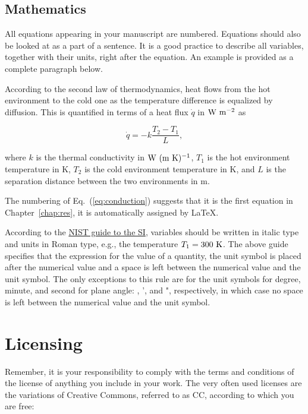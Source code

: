 \subsection{\label{sec:res_maths}Mathematics}

All equations appearing in your manuscript are numbered. Equations should also be looked at as a part of a sentence. It is a good practice to describe all variables, together with their units, right after the equation. An example is provided as a complete paragraph below.

According to the second law of thermodynamics, heat flows from the hot environment to the cold one as the temperature difference is equalized by diffusion. This is quantified in terms of a heat flux $\dot{q}$ in ${\rm W~m^{-2}}$ as

\begin{equation}\label{eq:conduction}
    \dot{q} = - k \frac{T_2 - T_1}{L},
\end{equation}

\noindent where $k$ is the thermal conductivity in ${\rm W~(m~K)^{-1}}$, $T_1$ is the hot environment temperature in K, $T_2$ is the cold environment temperature in K, and $L$ is the separation distance between the two environments in m.

The numbering of Eq.~(\ref{eq:conduction}) suggests that it is the first equation in Chapter~\ref{chap:res}, it is automatically assigned by \LaTeX.

According to the \href{https://www.nist.gov/pml/special-publication-811/nist-guide-si-chapter-7-rules-and-style-conventions-expressing-values}{NIST guide to the SI}, variables should be written in italic type and units in Roman type, e.g., the temperature $T_1 = 300~{\rm K}$. The above guide specifies that the expression for the value of a quantity, the unit symbol is placed after the numerical value and a space is left between the numerical value and the unit symbol. The only exceptions to this rule are for the unit symbols for degree, minute, and second for plane angle: \degree, ', and ", respectively, in which case no space is left between the numerical value and the unit symbol.

\section{\label{sec:res_lic}Licensing}

Remember, it is your responsibility to comply with the terms and conditions of the license of anything you include in your work. The very often used licenses are the variations of Creative Commons, referred to as CC, according to which you are free:

